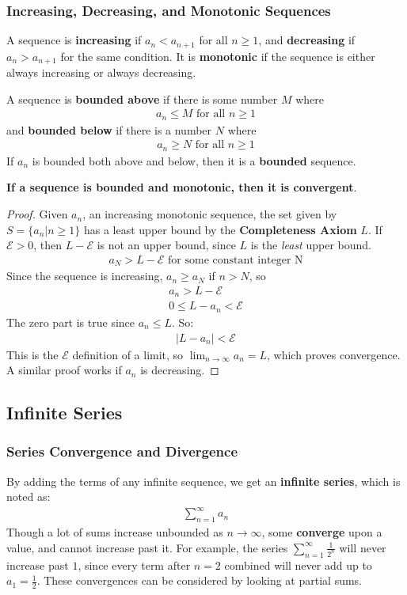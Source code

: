 \documentclass{article}
\begin{document}
\subsubsection{Increasing, Decreasing, and Monotonic Sequences}
A sequence is \textbf{increasing} if $a_n < a_{n+1}$ for all $n \geqslant 1$, and \textbf{decreasing} if $a_n > a_{n+1}$ for the same condition. It is \textbf{monotonic} if the sequence is either always increasing or always decreasing.

A sequence is \textbf{bounded above} if there is some number $M$ where
\begin{gather*}
    a_n \leqslant M\textrm{ for all $n \geqslant 1$}
\end{gather*}
and \textbf{bounded below} if there is a number $N$ where
\begin{gather*}
    a_n \geqslant N\textrm{ for all $n \geqslant 1$}
\end{gather*}
If $a_n$ is bounded both above and below, then it is a \textbf{bounded} sequence.

\textbf{If a sequence is bounded and monotonic, then it is convergent}.
\begin{proof}
Given $a_n$, an increasing monotonic sequence, the set given by $S = \{a_n|n \geqslant 1\}$ has a least upper bound by the \textbf{Completeness Axiom} $L$. If $\mathcal{E} > 0$, then $L - \mathcal{E}$ is not an upper bound, since $L$ is the \textit{least} upper bound.
\begin{gather*}
    a_N > L - \mathcal{E}\textrm{ for some constant integer N}
\end{gather*}
Since the sequence is increasing, $a_n \geqslant a_N$ if $n > N$, so
\begin{gather*}
    a_n > L - \mathcal{E}\\
    0 \leqslant L - a_n < \mathcal{E}
\end{gather*}
The zero part is true since $a_n \leqslant L$. So:
\begin{gather*}
    |L - a_n| < \mathcal{E}
\end{gather*}
This is the $\mathcal{E}$ definition of a limit, so $\lim_{n \to \infty} a_n = L$, which proves convergence. A similar proof works if $a_n$ is decreasing.
\end{proof}
\subsection{Infinite Series}
\subsubsection{Series Convergence and Divergence}
By adding the terms of any infinite sequence, we get an \textbf{infinite series}, which is noted as:
\begin{gather*}
    \sum_{n=1}^{\infty} a_n
\end{gather*}
Though a lot of sums increase unbounded as $n \to \infty$, some \textbf{converge} upon a value, and cannot increase past it. For example, the series $\sum_{n=1}^{\infty} \frac{1}{2^n}$ will never increase past $1$, since every term after $n=2$ combined will never add up to $a_1 = \frac{1}{2}$. These convergences can be considered by looking at partial sums.
\end{document}
